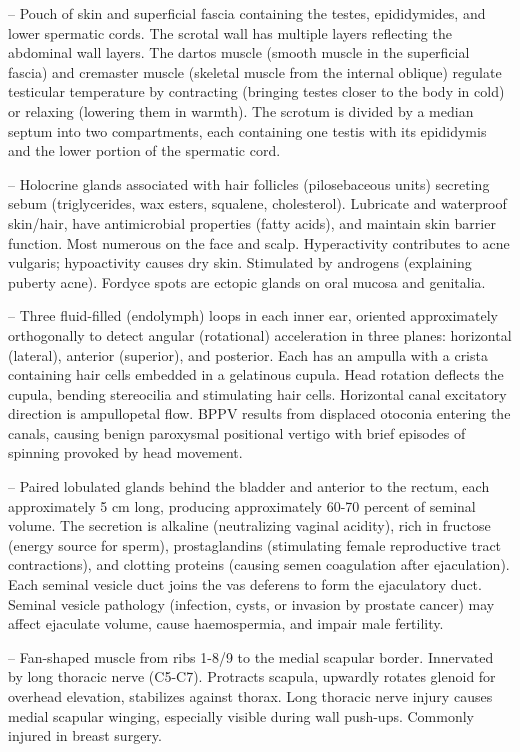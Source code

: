 -- Pouch of skin and superficial fascia containing the testes, epididymides, and lower spermatic cords. The scrotal wall has multiple layers reflecting the abdominal wall layers. The dartos muscle (smooth muscle in the superficial fascia) and cremaster muscle (skeletal muscle from the internal oblique) regulate testicular temperature by contracting (bringing testes closer to the body in cold) or relaxing (lowering them in warmth). The scrotum is divided by a median septum into two compartments, each containing one testis with its epididymis and the lower portion of the spermatic cord.

-- Holocrine glands associated with hair follicles (pilosebaceous units) secreting sebum (triglycerides, wax esters, squalene, cholesterol). Lubricate and waterproof skin/hair, have antimicrobial properties (fatty acids), and maintain skin barrier function. Most numerous on the face and scalp. Hyperactivity contributes to acne vulgaris; hypoactivity causes dry skin. Stimulated by androgens (explaining puberty acne). Fordyce spots are ectopic glands on oral mucosa and genitalia.

-- Three fluid-filled (endolymph) loops in each inner ear, oriented approximately orthogonally to detect angular (rotational) acceleration in three planes: horizontal (lateral), anterior (superior), and posterior. Each has an ampulla with a crista containing hair cells embedded in a gelatinous cupula. Head rotation deflects the cupula, bending stereocilia and stimulating hair cells. Horizontal canal excitatory direction is ampullopetal flow. BPPV results from displaced otoconia entering the canals, causing benign paroxysmal positional vertigo with brief episodes of spinning provoked by head movement.

-- Paired lobulated glands behind the bladder and anterior to the rectum, each approximately 5 cm long, producing approximately 60-70 percent of seminal volume. The secretion is alkaline (neutralizing vaginal acidity), rich in fructose (energy source for sperm), prostaglandins (stimulating female reproductive tract contractions), and clotting proteins (causing semen coagulation after ejaculation). Each seminal vesicle duct joins the vas deferens to form the ejaculatory duct. Seminal vesicle pathology (infection, cysts, or invasion by prostate cancer) may affect ejaculate volume, cause haemospermia, and impair male fertility.

-- Fan-shaped muscle from ribs 1-8/9 to the medial scapular border. Innervated by long thoracic nerve (C5-C7). Protracts scapula, upwardly rotates glenoid for overhead elevation, stabilizes against thorax. Long thoracic nerve injury causes medial scapular winging, especially visible during wall push-ups. Commonly injured in breast surgery.

